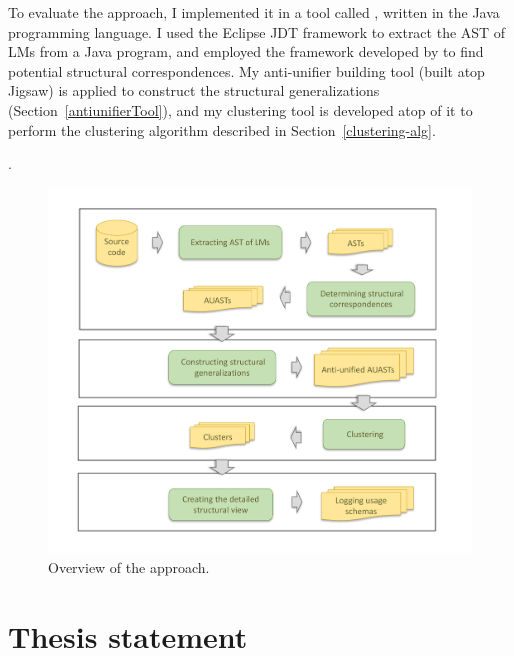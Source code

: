To evaluate the approach, I implemented it in a tool called , written in the Java programming language. I used the Eclipse JDT framework to extract the AST of LMs from a Java program, and employed the  framework developed by \citet{2008:fse:cottrell} to find potential structural correspondences. My anti-unifier building tool (built atop Jigsaw) is applied to construct the structural generalizations (Section~\ref{antiunifierTool}), and my clustering tool is developed atop of it to perform the clustering algorithm described in Section~\ref{clustering-alg}. 

. %


\begin{figure} [t]
  \centering\includegraphics [width = \textwidth]{Drawing4/SystemOverview.pdf}
  \caption{Overview of the approach. %
  }
  \label{fig:system_overview}
\end{figure}


\section{Thesis statement} \label{intro-stmt}


